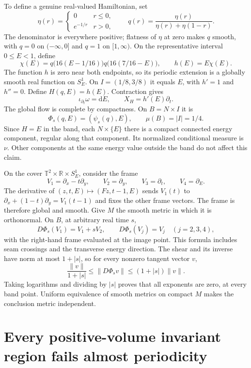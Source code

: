 \documentclass[11pt]{article}
\newcommand{\T}{\mathbb T}
\newcommand{\R}{\mathbb R}
\newcommand{\dd}{\mathrm d}
\begin{document}
To define a genuine real-valued Hamiltonian, set
\[
 \eta(r)=\begin{cases}0&r\le0,\\e^{-1/r}&r>0,\end{cases}
 \qquad q(r)=\frac{\eta(r)}{\eta(r)+\eta(1-r)}.
\]
The denominator is everywhere positive; flatness of $\eta$ at zero makes
$q$ smooth, with $q=0$ on $(-\infty,0]$ and $q=1$ on $[1,\infty)$.
On the representative interval $0\le E<1$, define
\[
 \chi(E)=q\bigl(16(E-1/16)\bigr)q\bigl(16(7/16-E)\bigr),
 \qquad h(E)=E\chi(E).
\]
The function $h$ is zero near both endpoints, so its periodic extension is
a globally smooth real function on $S^1_E$. On
$I=(1/8,3/8)$ it equals $E$, with $h'=1$ and $h''=0$.
Define $H(q,E)=h(E)$. Contraction gives
\[
 \iota_{\partial_t}\omega=\dd E,\qquad X_H=h'(E)\partial_t.
\]
The global flow is complete by compactness. On $B=N\times I$ it is
\begin{equation}\label{eq:bandflow}
 \Phi_s(q,E)=(\psi_s(q),E),\qquad \mu(B)=|I|=1/4.
\end{equation}
Since $H=E$ in the band, each $N\times\{E\}$ there is a compact
connected energy component, regular along that component. Its normalized
conditional measure is $\nu$. Other components at the same energy value
outside the band do not affect this claim.

On the cover $\T^2\times\R\times S^1_E$, consider the frame
\[
 V_1=\partial_x-t\partial_y,\qquad V_2=\partial_y,
 \qquad V_3=\partial_t,\qquad V_4=\partial_E.
\]
The derivative of $(z,t,E)\mapsto(Fz,t-1,E)$ sends $V_1(t)$ to
$\partial_x+(1-t)\partial_y=V_1(t-1)$ and fixes the other frame vectors.
The frame is therefore global and smooth. Give $M$ the smooth metric in
which it is orthonormal. On $B$, at arbitrary real time $s$,
\[
 D\Phi_s(V_1)=V_1+sV_2,\qquad D\Phi_s(V_j)=V_j\quad(j=2,3,4),
\]
with the right-hand frame evaluated at the image point. This formula includes
seam crossings and the transverse energy direction. The shear and its inverse
have norm at most $1+|s|$, so for every nonzero tangent vector $v$,
\[
 \frac{\|v\|}{1+|s|}\le\|D\Phi_s v\|\le(1+|s|)\|v\|.
\]
Taking logarithms and dividing by $|s|$ proves that all exponents are zero,
at every band point. Uniform equivalence of smooth metrics on compact $M$
makes the conclusion metric independent.

\section{Every positive-volume invariant region fails almost periodicity}
\end{document}
